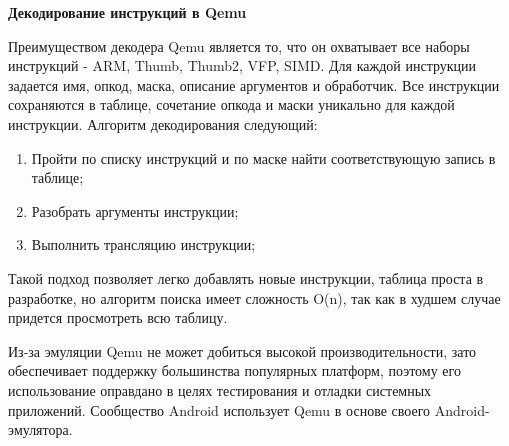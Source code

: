 {\bf Декодирование инструкций в Qemu}

Преимуществом декодера Qemu является то, что он охватывает все наборы инструкций - ARM, Thumb, Thumb2, VFP, SIMD. Для каждой инструкции задается имя, опкод, маска, описание аргументов и обработчик. Все инструкции сохраняются в таблице, сочетание опкода и маски уникально для каждой инструкции. Алгоритм декодирования следующий:

\begin{enumerate}
    \item Пройти по списку инструкций и по маске найти соответствующую запись в таблице;
    \item Разобрать аргументы инструкции;
    \item Выполнить трансляцию инструкции;
\end{enumerate}

Такой подход позволяет легко добавлять новые инструкции, таблица проста в разработке, но алгоритм поиска имеет сложность O(n), так как в худшем случае придется просмотреть всю таблицу.

Из-за эмуляции Qemu не может добиться высокой производительности, зато обеспечивает поддержку большинства популярных платформ, поэтому его использование оправдано в целях тестирования и отладки системных приложений. Сообщество Android использует Qemu в основе своего Android-эмулятора.






